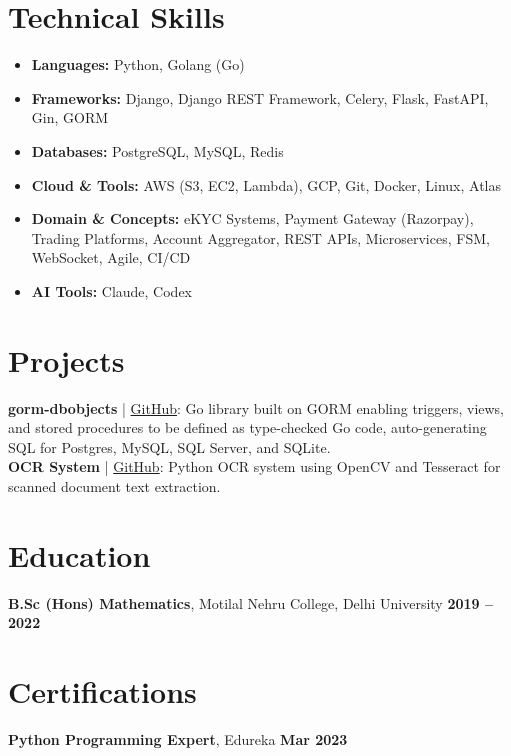 \documentclass[10pt,letterpaper]{article}
\begin{document}
\section*{Technical Skills}
\begin{itemize}
    \item \textbf{Languages:} Python, Golang (Go)
    \item \textbf{Frameworks:} Django, Django REST Framework, Celery, Flask, FastAPI, Gin, GORM
    \item \textbf{Databases:} PostgreSQL, MySQL, Redis
    \item \textbf{Cloud \& Tools:} AWS (S3, EC2, Lambda), GCP, Git, Docker, Linux, Atlas
    \item \textbf{Domain \& Concepts:} eKYC Systems, Payment Gateway (Razorpay), Trading Platforms, Account Aggregator, REST APIs, Microservices, FSM, WebSocket, Agile, CI/CD
    \item \textbf{AI Tools:} Claude, Codex
\end{itemize}

\section*{Projects}
\textbf{gorm-dbobjects} | \href{https://github.com/bg12345/gorm-dbobjects}{GitHub}: Go library built on GORM enabling triggers, views, and stored procedures to be defined as type-checked Go code, auto-generating SQL for Postgres, MySQL, SQL Server, and SQLite.\\
\textbf{OCR System} | \href{https://github.com/bg12345/OCR}{GitHub}: Python OCR system using OpenCV and Tesseract for scanned document text extraction.

\section*{Education}
\textbf{B.Sc (Hons) Mathematics}, Motilal Nehru College, Delhi University \hfill \textbf{2019 -- 2022}

\section*{Certifications}
\textbf{Python Programming Expert}, Edureka \hfill \textbf{Mar 2023}
\end{document}
